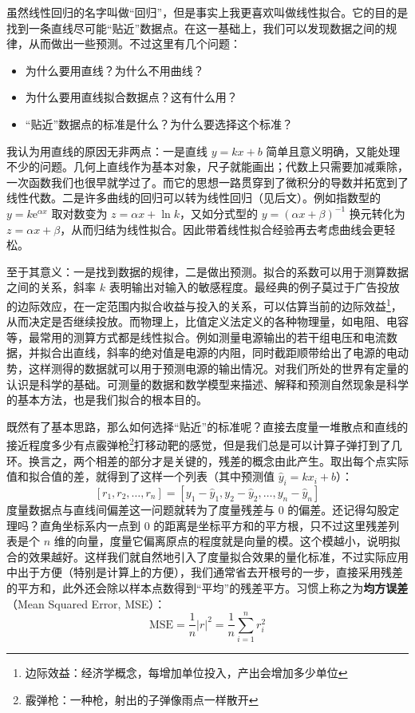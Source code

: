 \documentclass[UTF8, 12pt]{article}
\begin{document}
虽然线性回归的名字叫做“回归”，但是事实上我更喜欢叫做线性拟合。它的目的是找到一条直线尽可能“贴近”数据点。在这一基础上，我们可以发现数据之间的规律，从而做出一些预测。不过这里有几个问题：
\begin{itemize}
    \item 为什么要用直线？为什么不用曲线？
    \item 为什么要用直线拟合数据点？这有什么用？
    \item “贴近”数据点的标准是什么？为什么要选择这个标准？
\end{itemize}

我认为用直线的原因无非两点：一是直线 $y = kx+b$ 简单且意义明确，又能处理不少的问题。几何上直线作为基本对象，尺子就能画出；代数上只需要加减乘除，一次函数我们也很早就学过了。而它的思想一路贯穿到了微积分的导数并拓宽到了线性代数。二是许多曲线的回归可以转为线性回归（见后文）。例如指数型的 $y = k \mathrm{e}^{\alpha x}$ 取对数变为 $z = \alpha x + \ln k$，又如分式型的 $y = (\alpha x + \beta)^{-1}$ 换元转化为 $z = \alpha x + \beta$，从而归结为线性拟合。因此带着线性拟合经验再去考虑曲线会更轻松。

至于其意义：一是找到数据的规律，二是做出预测。拟合的系数可以用于测算数据之间的关系，斜率 $k$ 表明输出对输入的敏感程度。最经典的例子莫过于广告投放的边际效应，在一定范围内拟合收益与投入的关系，可以估算当前的边际效益\footnote{边际效益：经济学概念，每增加单位投入，产出会增加多少单位}，从而决定是否继续投放。而物理上，比值定义法定义的各种物理量，如电阻、电容等，最常用的测算方式都是线性拟合。例如测量电源输出的若干组电压和电流数据，并拟合出直线，斜率的绝对值是电源的内阻，同时截距顺带给出了电源的电动势，这样测得的数据就可以用于预测电源的输出情况。对我们所处的世界有定量的认识是科学的基础。可测量的数据和数学模型来描述、解释和预测自然现象是科学的基本方法，也是我们拟合的根本目的。

既然有了基本思路，那么如何选择“贴近”的标准呢？直接去度量一堆散点和直线的接近程度多少有点霰弹枪\footnote{霰弹枪：一种枪，射出的子弹像雨点一样散开}打移动靶的感觉，但是我们总是可以计算子弹打到了几环。换言之，两个相差的部分才是关键的，残差的概念由此产生。取出每个点实际值和拟合值的差，就得到了这样一个列表（其中预测值 $\hat y_i = kx_i + b$）：
\[
    [r_1, r_2, \ldots, r_n] = [y_1 - \hat y_1, y_2 - \hat y_2, \ldots, y_n - \hat y_n]
\]
度量数据点与直线间偏差这一问题就转为了度量残差与 0 的偏差。还记得勾股定理吗？直角坐标系内一点到 0 的距离是坐标平方和的平方根，只不过这里残差列表是个 $n$ 维的向量，度量它偏离原点的程度就是向量的模。这个模越小，说明拟合的效果越好。这样我们就自然地引入了度量拟合效果的量化标准，不过实际应用中出于方便（特别是计算上的方便），我们通常省去开根号的一步，直接采用残差的平方和，此外还会除以样本点数得到“平均”的残差平方。习惯上称之为\textbf{均方误差}（Mean Squared Error, MSE）：
\[
    \text{MSE} = \frac1n |r|^2 = \frac1n \sum_{i=1}^n r_i^2
\]
\end{document}
